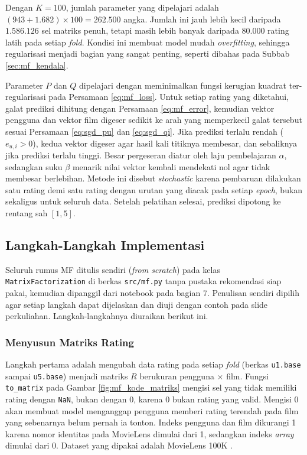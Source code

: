 Dengan $K = 100$, jumlah parameter yang dipelajari adalah $(943 + 1.682) \times 100 = 262.500$ angka. Jumlah ini jauh lebih kecil daripada $1.586.126$ sel matriks penuh, tetapi masih lebih banyak daripada 80.000 rating latih pada setiap \textit{fold}. Kondisi ini membuat model mudah \textit{overfitting}, sehingga regularisasi menjadi bagian yang sangat penting, seperti dibahas pada Subbab \ref{sec:mf_kendala}.

Parameter $P$ dan $Q$ dipelajari dengan meminimalkan fungsi kerugian kuadrat ter-regularisasi pada Persamaan \ref{eq:mf_loss}. Untuk setiap rating yang diketahui, galat prediksi dihitung dengan Persamaan \ref{eq:mf_error}, kemudian vektor pengguna dan vektor film digeser sedikit ke arah yang memperkecil galat tersebut sesuai Persamaan \ref{eq:sgd_pu} dan \ref{eq:sgd_qi}. Jika prediksi terlalu rendah ($e_{u,i} > 0$), kedua vektor digeser agar hasil kali titiknya membesar, dan sebaliknya jika prediksi terlalu tinggi. Besar pergeseran diatur oleh laju pembelajaran $\alpha$, sedangkan suku $\beta$ menarik nilai vektor kembali mendekati nol agar tidak membesar berlebihan. Metode ini disebut \textit{stochastic} karena pembaruan dilakukan satu rating demi satu rating dengan urutan yang diacak pada setiap \textit{epoch}, bukan sekaligus untuk seluruh data. Setelah pelatihan selesai, prediksi dipotong ke rentang sah $[1, 5]$.

\subsection{Langkah-Langkah Implementasi}
Seluruh rumus MF ditulis sendiri (\textit{from scratch}) pada kelas \texttt{MatrixFactorization} di berkas \texttt{src/mf.py} tanpa pustaka rekomendasi siap pakai, kemudian dipanggil dari notebook pada bagian 7. Penulisan sendiri dipilih agar setiap langkah dapat dijelaskan dan diuji dengan contoh pada slide perkuliahan. Langkah-langkahnya diuraikan berikut ini.

\subsubsection{Menyusun Matriks Rating}
Langkah pertama adalah mengubah data rating pada setiap \textit{fold} (berkas \texttt{u1.base} sampai \texttt{u5.base}) menjadi matriks $R$ berukuran pengguna $\times$ film. Fungsi \texttt{to\_matrix} pada Gambar \ref{fig:mf_kode_matriks} mengisi sel yang tidak memiliki rating dengan \texttt{NaN}, bukan dengan 0, karena 0 bukan rating yang valid. Mengisi 0 akan membuat model menganggap pengguna memberi rating terendah pada film yang sebenarnya belum pernah ia tonton. Indeks pengguna dan film dikurangi 1 karena nomor identitas pada MovieLens dimulai dari 1, sedangkan indeks \textit{array} dimulai dari 0. Dataset yang dipakai adalah MovieLens 100K \citep{harper2015movielens}.

